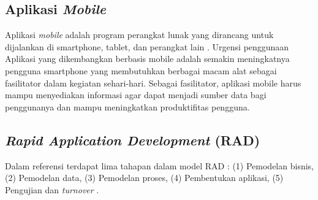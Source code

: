 \begin{flushleft}
\begin{justify}
        \subsection{Aplikasi \textit{Mobile}}
        Aplikasi \textit{mobile} adalah program perangkat lunak yang dirancang untuk dijalankan di smartphone, tablet, dan perangkat lain \cite{mobile}. Urgensi penggunaan Aplikasi yang dikembangkan berbasis mobile adalah semakin meningkatnya pengguna smartphone yang membutuhkan berbagai macam alat sebagai fasilitator dalam kegiatan sehari-hari. Sebagai fasilitator, aplikasi mobile harus mampu menyediakan informasi agar dapat menjadi sumber data bagi penggunanya dan mampu meningkatkan produktifitas pengguna. 
        \\
        \subsection{\textit{Rapid Application Development} (RAD)}
        Dalam referensi \cite{Sukamto} terdapat lima tahapan dalam model RAD : (1) Pemodelan bisnis, (2) Pemodelan data, (3) Pemodelan proses, (4) Pembentukan aplikasi, (5) Pengujian dan \textit{turnover} .
        
        \begin{figure}[ht]
            \centering
           

\end{figure}
\end{justify}
\end{flushleft}
